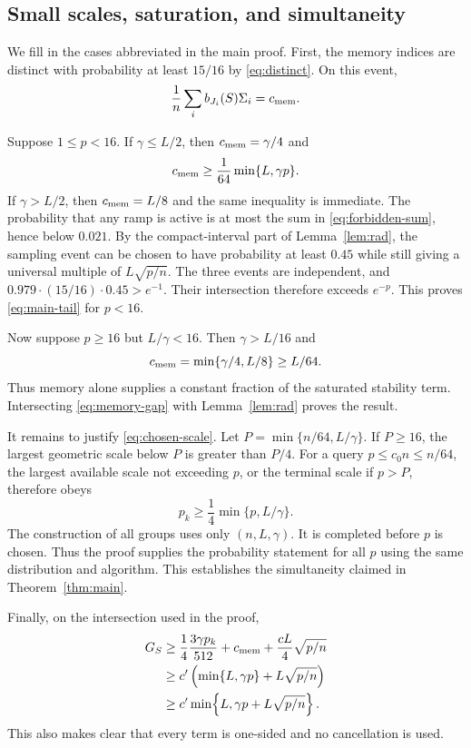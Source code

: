\subsection{Small scales, saturation, and simultaneity}\label{app:cases}

We fill in the cases abbreviated in the main proof. First, the memory indices are distinct with
probability at least $15/16$ by \eqref{eq:distinct}. On this event,
\begin{equation}
 \frac1n\sum_i b_{J_i}(S)\Sigma_i=c_{\rm mem}.
 \label{eq:memory-gap}
\end{equation}

Suppose $1\le p<16$. If $\gamma\le L/2$, then $c_{\rm mem}=\gamma/4$ and
\[
 c_{\rm mem}\ge\frac1{64}\min\{L,\gamma p\}.
\]
If $\gamma>L/2$, then $c_{\rm mem}=L/8$ and the same inequality is immediate. The probability
that any ramp is active is at most the sum in \eqref{eq:forbidden-sum}, hence below $0.021$.
By the compact-interval part of Lemma~\ref{lem:rad}, the sampling event can be chosen to have
probability at least $0.45$ while still giving a universal multiple of $L\sqrt{p/n}$.
The three events are independent, and
$0.979\cdot(15/16)\cdot0.45>e^{-1}$. Their intersection therefore exceeds $e^{-p}$.
This proves \eqref{eq:main-tail} for $p<16$.

Now suppose $p\ge16$ but $L/\gamma<16$. Then $\gamma>L/16$ and
\begin{equation}
 c_{\rm mem}=\min\{\gamma/4,L/8\}\ge L/64.
 \label{eq:memory-saturated}
\end{equation}
Thus memory alone supplies a constant fraction of the saturated stability term. Intersecting
\eqref{eq:memory-gap} with Lemma~\ref{lem:rad} proves the result.

It remains to justify \eqref{eq:chosen-scale}. Let
$P=\min\{n/64,L/\gamma\}$. If $P\ge16$, the largest geometric scale below $P$ is greater than
$P/4$. For a query $p\le c_0n\le n/64$, the largest available scale not exceeding $p$, or the terminal
scale if $p>P$, therefore obeys
\[
 p_k\ge\frac14\min\{p,L/\gamma\}.
\]
The construction of all groups uses only $(n,L,\gamma)$. It is completed before $p$ is chosen.
Thus the proof supplies the probability statement for all $p$ using the same distribution and
algorithm. This establishes the simultaneity claimed in Theorem~\ref{thm:main}.

Finally, on the intersection used in the proof,
\begin{align}
 G_S
 &\ge \frac14\frac{3\gamma p_k}{512}
       +c_{\rm mem}
       +\frac{cL}{4}\sqrt{p/n}\\
 &\ge c'\left(\min\{L,\gamma p\}+L\sqrt{p/n}\right)\\
 &\ge c'\min\!\left\{L,\gamma p+L\sqrt{p/n}\right\}.
\end{align}
This also makes clear that every term is one-sided and no cancellation is used.

